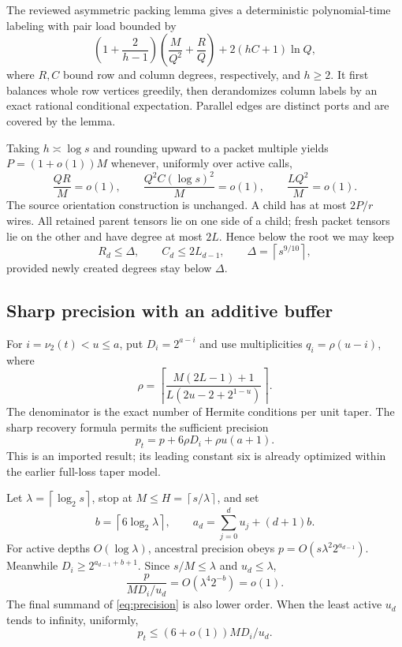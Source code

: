 \documentclass[11pt]{article}
\theoremstyle{definition}\newtheorem{definition}[theorem]{Definition}
\theoremstyle{remark}\newtheorem{remark}[theorem]{Remark}
\newcommand{\vv}{\nu_2}
\newcommand{\ceil}[1]{\left\lceil#1\right\rceil}
\begin{document}
The reviewed asymmetric packing lemma gives a deterministic polynomial-time
labeling with pair load bounded by
\begin{equation}
 \left(1+\frac2{h-1}\right)
 \left(\frac M{Q^2}+\frac RQ\right)+2(hC+1)\ln Q,\label{eq:load}
\end{equation}
where $R,C$ bound row and column degrees, respectively, and $h\ge2$.
It first balances whole row vertices greedily, then derandomizes column
labels by an exact rational conditional expectation. Parallel edges are
distinct ports and are covered by the lemma.

Taking $h\asymp\log s$ and rounding upward to a packet multiple yields
$P=(1+o(1))M$ whenever, uniformly over active calls,
\begin{equation}
 \frac{QR}{M}=o(1),\qquad
 \frac{Q^2C(\log s)^2}{M}=o(1),\qquad
 \frac{LQ^2}{M}=o(1).\label{eq:padding-gates}
\end{equation}
The source orientation construction is unchanged. A child has at most
$2P/r$ wires. All retained parent tensors lie on one side of a child; fresh
packet tensors lie on the other and have degree at most $2L$. Hence below
the root we may keep
\begin{equation}
 R_d\le\Delta,\qquad C_d\le2L_{d-1},\qquad
 \Delta=\ceil{s^{9/10}},\label{eq:side-degrees}
\end{equation}
provided newly created degrees stay below $\Delta$.

\subsection{Sharp precision with an additive buffer}

For $i=\vv(t)<u\le a$, put $D_i=2^{a-i}$ and use multiplicities
$q_i=\rho(u-i)$, where
\[
 \rho=\ceil{\frac{M(2L-1)+1}{L(2u-2+2^{1-u})}}.
\]
The denominator is the exact number of Hermite conditions per unit taper.
The sharp recovery formula permits the sufficient precision
\begin{equation}
 p_t=p+6\rho D_i+\rho u(a+1).\label{eq:precision}
\end{equation}
This is an imported result; its leading constant six is already optimized
within the earlier full-loss taper model.

Let $\lambda=\ceil{\log_2s}$, stop at $M\le H=\ceil{s/\lambda}$, and set
\begin{equation}
 b=\ceil{6\log_2\lambda},\qquad
 a_d=\sum_{j=0}^d u_j+(d+1)b.\label{eq:buffer}
\end{equation}
For active depths $O(\log\lambda)$, ancestral precision obeys
$p=O(s\lambda^2 2^{a_{d-1}})$. Meanwhile
$D_i\ge2^{a_{d-1}+b+1}$. Since $s/M\le\lambda$ and $u_d\le\lambda$,
\[
 \frac{p}{MD_i/u_d}=O(\lambda^4 2^{-b})=o(1).
\]
The final summand of \eqref{eq:precision} is also lower order. When the
least active $u_d$ tends to infinity, uniformly,
\begin{equation}
 p_t\le(6+o(1))MD_i/u_d.\label{eq:precision-envelope}
\end{equation}
\end{document}
